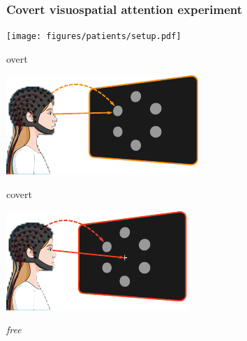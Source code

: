 \documentclass{kul-ulille-beamer}
\begin{document}
\begin{frame}
  \frametitle{Covert visuospatial attention experiment}

  \begin{minipage}{.6\textwidth}
    \centering
    \hfill
    \texttt{[image: figures/patients/setup.pdf]}%
    \hfill%
    \bigskip
    \bigskip

    {\small
    \begin{minipage}{.3\textwidth}
      overt
      \smallskip

      \includegraphics[width=\textwidth]{figures/covert/attention_overt.pdf}
    \end{minipage}\hfill%
    \begin{minipage}{.3\textwidth}
      covert
      \smallskip

      \includegraphics[width=\textwidth]{figures/covert/attention_covert.pdf}
    \end{minipage}\hfill%
    \begin{minipage}{.3\textwidth}
      \small
      \emph{free}
      \smallskip


\end{minipage}}
\end{minipage}
\end{frame}
\end{document}
